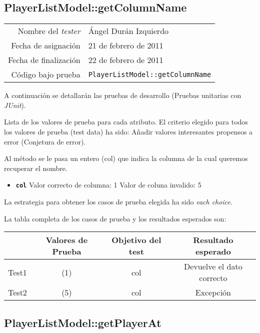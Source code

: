 \subsection{PlayerListModel::getColumnName}

{\small
\begin{tabular}{r|l}
Nombre del \textit{tester} & \'Angel Dur\'an Izquierdo\\
Fecha de asignación & 21 de febrero de 2011 \\
Fecha de finalización & 22 de febrero de 2011 \\
Código bajo prueba & \texttt{PlayerListModel::getColumnName}
\end{tabular}
}

A continuación se detallarán las pruebas de desarrollo (Pruebas unitarias con \textit{JUnit}).

Lista de los valores de prueba para cada atributo.
El criterio elegido para todos los valores de prueba (test data) ha sido: Añadir valores interesantes propensos a error (Conjetura de error).

Al m\'etodo se le pasa un entero (col) que indica la columna de la cual queremos recuperar el nombre.

\begin{itemize}
\item \textbf{\texttt{col}}
\subitem Valor correcto de columna: 1
\subitem Valor de coluna invalido: 5
\end{itemize}

La estrategia para obtener los casos de prueba elegida ha sido
\textit{each choice}.

La tabla completa de los casos de prueba y los resultados esperados son:

{\footnotesize
\begin{longtable}[c]{lccc}
 & \textbf{Valores de Prueba} & \textbf{Objetivo del test} & \textbf{Resultado esperado} \\
\hline \hline
\endhead

Test1 & (1) & col & Devuelve el dato correcto\\
Test2 & (5) & col & Excepci\'on\\

\hline
\end{longtable}
}

\subsection{PlayerListModel::getPlayerAt}

